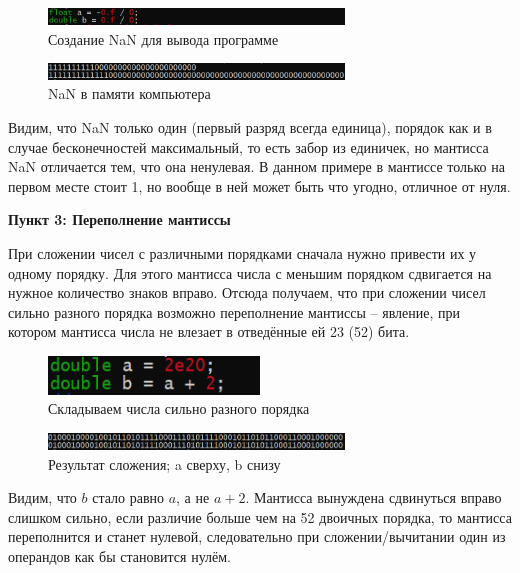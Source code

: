 \documentclass[a4paper,12pt]{article}
\begin{document}
\begin{figure}[H]\label{fig: bits NaN}
    \centering
    \includegraphics[width=0.7\textwidth]{Вставка NaN.png}
    \caption{Создание NaN для вывода программе}
\end{figure}

\begin{figure}[H]\label{fig: bits NaN result}
    \centering
    \includegraphics[width=0.7\textwidth]{Побитовое представление NaN.png}
    \caption{NaN в памяти компьютера}
\end{figure}
Видим, что NaN только один (первый разряд всегда единица), порядок как и в случае бесконечностей максимальный, то есть забор из единичек, но мантисса NaN отличается тем, что она ненулевая. В данном примере в мантиссе только на первом месте стоит 1, но вообще в ней может быть что угодно, отличное от нуля.

\textbf{Пункт 3: Переполнение мантиссы}

При сложении чисел с различными порядками сначала нужно привести их у одному порядку. Для этого мантисса числа с меньшим порядком сдвигается на нужное количество знаков вправо. Отсюда получаем, что при сложении чисел сильно разного порядка возможно переполнение мантиссы -- явление, при котором мантисса числа не влезает в отведённые ей 23 (52) бита.
\begin{figure}[H]\label{fig: Mantissa overflow code}
    \centering
    \includegraphics[width = 0.5\textwidth]{Переполнение мантиссы код.png}
    \caption{Складываем числа сильно разного порядка}
\end{figure}
\begin{figure}[H]\label{fig: Mantissa overflow result}
    \centering
    \includegraphics[width = 0.7\textwidth]{Переполнение мантиссы результат.png}
    \caption{Результат сложения; a сверху, b снизу}
\end{figure}
Видим, что $b$ стало равно $a$, а не $a + 2$. Мантисса вынуждена сдвинуться вправо слишком сильно, если различие больше чем на 52 двоичных порядка, то мантисса переполнится и станет нулевой, следовательно при сложении/вычитании один из операндов как бы становится нулём. 
\end{document}
